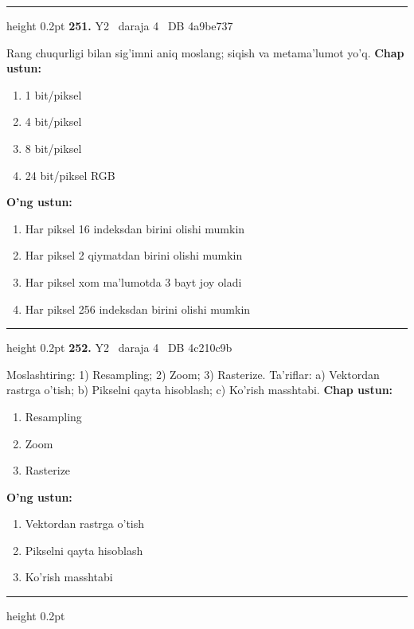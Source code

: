 \documentclass[10pt,a4paper,oneside]{article}
\begin{document}
\vspace{2mm}\hrule height 0.2pt \vspace{4mm}
\hypertarget{q251}{\textbf{\color{ink}251.}}  {\color{muted}\scriptsize Y2 \textbullet\ daraja 4 \textbullet\ DB 4a9be737}
\par
Rang chuqurligi bilan sig'imni aniq moslang; siqish va metama'lumot yo'q.
\textbf{\footnotesize Chap ustun:}
\begin{enumerate}[label=\arabic*),leftmargin=9mm]
\item 1 bit/piksel
\item 4 bit/piksel
\item 8 bit/piksel
\item 24 bit/piksel RGB
\end{enumerate}
\textbf{\footnotesize O'ng ustun:}
\begin{enumerate}[label=\Alph*),leftmargin=9mm]
\item Har piksel 16 indeksdan birini olishi mumkin
\item Har piksel 2 qiymatdan birini olishi mumkin
\item Har piksel xom ma'lumotda 3 bayt joy oladi
\item Har piksel 256 indeksdan birini olishi mumkin
\end{enumerate}
\vspace{2mm}\hrule height 0.2pt \vspace{4mm}
\hypertarget{q252}{\textbf{\color{ink}252.}}  {\color{muted}\scriptsize Y2 \textbullet\ daraja 4 \textbullet\ DB 4c210c9b}
\par
Moslashtiring: 1) Resampling; 2) Zoom; 3) Rasterize. Ta'riflar: a) Vektordan rastrga o'tish; b) Pikselni qayta hisoblash; c) Ko'rish masshtabi.
\textbf{\footnotesize Chap ustun:}
\begin{enumerate}[label=\arabic*),leftmargin=9mm]
\item Resampling
\item Zoom
\item Rasterize
\end{enumerate}
\textbf{\footnotesize O'ng ustun:}
\begin{enumerate}[label=\Alph*),leftmargin=9mm]
\item Vektordan rastrga o'tish
\item Pikselni qayta hisoblash
\item Ko'rish masshtabi
\end{enumerate}
\vspace{2mm}\hrule height 0.2pt \vspace{4mm}
\end{document}
